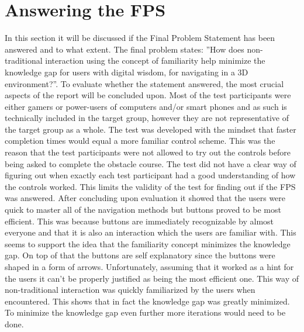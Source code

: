 \section*{Answering the FPS}
In this section it will be discussed if the Final Problem Statement has been answered and to what extent. The final problem states: ”How does non-traditional interaction using the concept of familiarity help minimize the knowledge gap for users with digital wisdom, for navigating in a 3D environment?”. To evaluate whether the statement answered, the most crucial aspects of the report will be concluded upon. 
Most of the test participants were either gamers or power-users of computers and/or smart phones and as such is technically included in the target group, however they are not representative of the target group as a whole. 
The test was developed with the mindset that faster completion times would equal a more familiar control scheme. This was the reason that the test participants were not allowed to try out the controls before being asked to complete the obstacle course. The test did not have a clear way of figuring out when exactly each test participant had a good understanding of how the controls worked. This limits the validity of the test for finding out if the FPS was answered.
After concluding upon evaluation it showed that the users were quick to master all of the navigation methods but buttons proved to be most efficient. This was because buttons are immediately recognizable by almost everyone and that it is also an interaction which the users are familiar with. This seems to support the idea that the familiarity concept minimizes the knowledge gap. On top of that the buttons are self explanatory since the buttons were shaped in a form of arrows. Unfortunately, assuming that it worked as a hint for the users it can’t be properly justified as being the most efficient one. 
This way of non-traditional interaction was quickly familiarized by the users when encountered. This shows that in fact the knowledge gap was greatly minimized. To minimize the knowledge gap even further more iterations would need to be done.